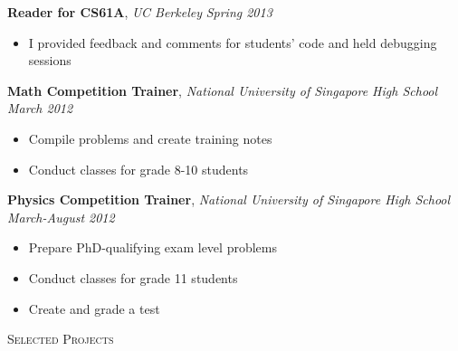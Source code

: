 \documentclass[9pt]{article}
\newenvironment{changemargin}[2]{%
  \begin{list}{}{%
      \setlength{\topsep}{0pt}%
      \setlength{\leftmargin}{#1}%
      \setlength{\rightmargin}{#2}%
      \setlength{\listparindent}{\parindent}%
      \setlength{\itemindent}{\parindent}%
      \setlength{\parsep}{\parskip}%
    }%
  \item[]}{\end{list}
}
\newcommand{\lineover}{
  \begin{changemargin}{-0.05in}{-0.05in}
    \vspace*{-8pt}
    \hrulefill \\
    \vspace*{-2pt}
  \end{changemargin}
}
\newcommand{\header}[1]{
  \begin{changemargin}{-0.5in}{-0.5in}
    \scshape{#1}\\
    \lineover
  \end{changemargin}
}
\newenvironment{body} {
  \vspace*{-16pt}
  \begin{changemargin}{-0.25in}{-0.5in}
  }
  {\end{changemargin}
}
\begin{document}
\begin{body}
  \textbf{Reader for CS61A}, \emph{UC Berkeley} \hfill \emph{Spring 2013}\\
  \vspace*{-4pt}
  \begin{itemize} \itemsep -0pt  %
  \item I provided feedback and comments for students' code and held debugging     sessions
  \end{itemize}

  \textbf{Math Competition Trainer}, \emph{National University of Singapore High School} \hfill \emph{March 2012}\\
  \vspace*{-4pt}
  \begin{itemize} \itemsep -0pt  %
  \item Compile problems and create training notes
  \item Conduct classes for grade 8-10 students
  \end{itemize}

  \textbf{Physics Competition Trainer}, \emph{National University of Singapore High School} \hfill \emph{March-August 2012}\\
  \vspace*{-4pt}
  \begin{itemize} \itemsep -0pt  %
  \item Prepare PhD-qualifying exam level problems
  \item Conduct classes for grade 11 students
  \item Create and grade a test
  \end{itemize}
\end{body}

\smallskip

\header{Selected Projects}
\end{document}
